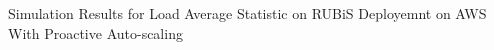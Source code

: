 \label{proactive} Simulation Results for Load Average Statistic on RUBiS Deployemnt on AWS With Proactive Auto-scaling